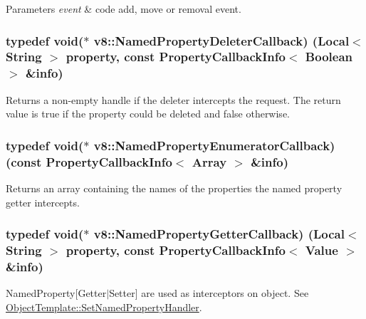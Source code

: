 \begin{DoxyParams}{Parameters}
{\em event} & code add, move or removal event. \\
\hline
\end{DoxyParams}
\hypertarget{namespacev8_aaba861076c5b111912cfa0791d348437}{}
\subsubsection[{Named\+Property\+Deleter\+Callback}]{\setlength{\rightskip}{0pt plus 5cm}typedef void($\ast$ v8\+::\+Named\+Property\+Deleter\+Callback) ({\bf Local}$<$ {\bf String} $>$ property, const {\bf Property\+Callback\+Info}$<$ {\bf Boolean} $>$ \&info)}\label{namespacev8_aaba861076c5b111912cfa0791d348437}
Returns a non-\/empty handle if the deleter intercepts the request. The return value is true if the property could be deleted and false otherwise. \hypertarget{namespacev8_a5f6f16818a9cddacadbfe6d90ca3a6b1}{}
\subsubsection[{Named\+Property\+Enumerator\+Callback}]{\setlength{\rightskip}{0pt plus 5cm}typedef void($\ast$ v8\+::\+Named\+Property\+Enumerator\+Callback) (const {\bf Property\+Callback\+Info}$<$ {\bf Array} $>$ \&info)}\label{namespacev8_a5f6f16818a9cddacadbfe6d90ca3a6b1}
Returns an array containing the names of the properties the named property getter intercepts. \hypertarget{namespacev8_a50cae386a68bf9ff23d02aa1161face4}{}
\subsubsection[{Named\+Property\+Getter\+Callback}]{\setlength{\rightskip}{0pt plus 5cm}typedef void($\ast$ v8\+::\+Named\+Property\+Getter\+Callback) ({\bf Local}$<$ {\bf String} $>$ property, const {\bf Property\+Callback\+Info}$<$ {\bf Value} $>$ \&info)}\label{namespacev8_a50cae386a68bf9ff23d02aa1161face4}
Named\+Property\mbox{[}Getter$\vert$\+Setter\mbox{]} are used as interceptors on object. See \hyperlink{classv8_1_1_object_template_ac7bcbb6e2936ab38490680f7e1bfb787}{Object\+Template\+::\+Set\+Named\+Property\+Handler}. \hypertarget{namespacev8_ac135beae5f0c8b290255accb438f990e}{}
